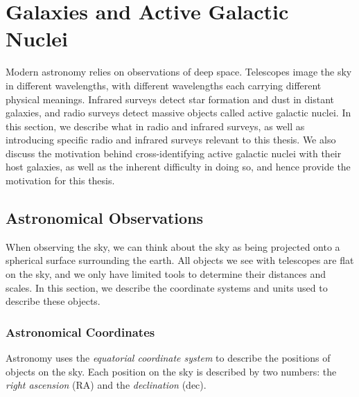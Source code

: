 \chapter{Galaxies and Active Galactic Nuclei}
\label{cha:astro}

    Modern astronomy relies on observations of deep space. Telescopes image the
    sky in different wavelengths, with different wavelengths each carrying
    different physical meanings. Infrared surveys detect star formation and dust
    in distant galaxies, and radio surveys detect massive objects called active
    galactic nuclei. In this section, we describe what in radio and infrared
    surveys, as well as introducing specific radio and infrared surveys relevant
    to this thesis. We also discuss the motivation behind cross-identifying
    active galactic nuclei with their host galaxies, as well as the inherent
    difficulty in doing so, and hence provide the motivation for this thesis.

    \section{Astronomical Observations}
    \label{sec:astronomical-observations}

        When observing the sky, we can think about the sky as being projected
        onto a spherical surface surrounding the earth. All objects we see with
        telescopes are flat on the sky, and we only have limited tools to
        determine their distances and scales. In this section, we describe the
        coordinate systems and units used to describe these objects.

        \subsection{Astronomical Coordinates}
        \label{sec:coordinates}

            Astronomy uses the \emph{equatorial coordinate system} to describe
            the positions of objects on the sky. Each position on the sky is
            described by two numbers: the \emph{right ascension} (RA) and the
            \emph{declination} (dec).

